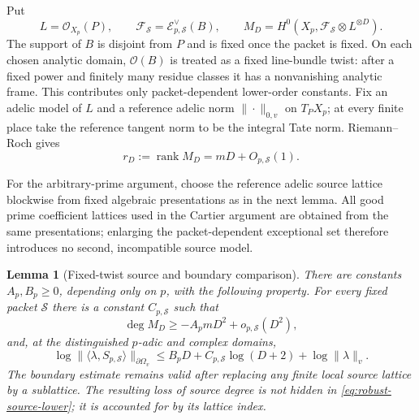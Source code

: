 \documentclass[11pt]{article}
\newtheorem{lemma}[lemma]{Lemma}
\theoremstyle{definition}
\theoremstyle{remark}
\newcommand{\rank}{\operatorname{rank}}
\newcommand{\calE}{\mathcal E}
\newcommand{\calF}{\mathcal F}
\newcommand{\calO}{\mathcal O}
\newcommand{\widehatdeg}{\widehat{\deg}}
\begin{document}
Put
\[
 L=\calO_{X_p}(P),\qquad
 \calF_{\mathcal S}=\calE_{p,\mathcal S}^{\vee}(B),\qquad
 M_D=H^0(X_p,\calF_{\mathcal S}\otimes L^{\otimes D}).
\]
The support of $B$ is disjoint from $P$ and is fixed once the packet is fixed.
On each chosen analytic domain, $\calO(B)$ is treated as a fixed line-bundle
twist: after a fixed power and finitely many residue classes it has a
nonvanishing analytic frame.  This contributes only packet-dependent
lower-order constants.  Fix an adelic model of $L$ and a reference adelic
norm $\|\cdot\|_{0,v}$ on $T_PX_p$; at every finite place take the
reference tangent norm to be the integral Tate norm.  Riemann--Roch
gives
\begin{equation}\label{eq:robust-source-rank}
 r_D:=\rank M_D=mD+O_{p,\mathcal S}(1).
\end{equation}

For the arbitrary-prime argument, choose the reference adelic source lattice
blockwise from fixed algebraic presentations as in the next lemma.  All good
prime coefficient lattices used in the Cartier argument are obtained from the
same presentations; enlarging the packet-dependent exceptional set therefore
introduces no second, incompatible source model.

\begin{lemma}[Fixed-twist source and boundary comparison]
\label{lem:robust-fixed-twist}
There are constants $A_p,B_p\ge0$, depending only on $p$, with the following
property.  For every fixed packet $\mathcal S$ there is a constant
$C_{p,\mathcal S}$ such that
\begin{equation}\label{eq:robust-source-lower}
 \widehatdeg M_D\ge-A_pmD^2+o_{p,\mathcal S}(D^2),
\end{equation}
and, at the distinguished $p$-adic and complex domains,
\begin{equation}\label{eq:robust-boundary-comparison}
 \log\|\langle\lambda,S_{p,\mathcal S}\rangle\|_{\partial\Omega_v}
 \le B_pD+C_{p,\mathcal S}\log(D+2)+\log\|\lambda\|_v.
\end{equation}
The boundary estimate remains valid after replacing any finite local source
lattice by a sublattice.  The resulting loss of source degree is not hidden in
\eqref{eq:robust-source-lower}; it is accounted for by its lattice index.
\end{lemma}
\end{document}
